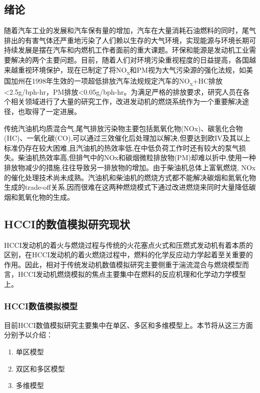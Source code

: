 \documentclass{ctexart}
\begin{document}
	\begin{mainmatter}
		\section{绪论}
		
		随着汽车工业的发展和汽车保有量的增加，汽车在大量消耗石油燃料的同时，尾气排出的有害气体还严重地污染了人们赖以生存的大气环境，实现能源与环境长期可持续发展是摆在汽车和内燃机工作者面前的重大课题。环保和能源是发动机工业需要解决的两个主要问题。目前，随着人们对环境污染重视程度的日益提高，各国越来越重视环境保护，现在已制定了将NO\textsubscript{x}和PM视为大气污染源的强化法规，如美国加州在1998年生效的一项超低排放汽车法规规定汽车的NO\textsubscript{x}+HC排放<2.5g/bph-hr，PM排放<0.05g/bph-hr。为满足严格的排放要求，研究人员在各个相关领域进行了大量的研究工作，改进发动机的燃烧系统作为一个重要解决途径，也取得了一定进展\cite{ref1}。
		
		传统汽油机均质混合气,尾气排放污染物主要包括氮氧化物(NOx)、碳氢化合物(HC)、一氧化碳(CO),可以通过三效催化后处理加以解决,但要达到欧IV及其以上标准仍存在较大困难,且汽油机的热效率低,在中低负荷工作时还有较大的泵气损失。柴油机热效率高,但排气中的NOx和碳烟微粒排放物(PM)却难以折中,使用一种排放物减少的措施,往往导致另一排放物的增加。由于柴油机总体上富氧燃烧, NOx的催化处理技术尚未成熟。汽油机和柴油机的燃烧方式都不能解决碳烟和氮氧化物生成的trade-off关系,因而很难在这两种燃烧模式下通过改进燃烧来同时大量降低碳烟和氮氧化物的生成。
		
		\subsection{HCCI的数值模拟研究现状}
		\par\indent HCCI发动机的着火与燃烧过程与传统的火花塞点火式和压燃式发动机有着本质的区别，在HCCI发动机的着火燃烧过程中，燃料的化学反应动力学起着至关重要的作用。因此，相对于传统发动机数值模拟研究主要侧重于湍流混合与燃烧模型而言，HCCI发动机燃烧模拟的焦点主要集中在燃料的反应机理和化学动力学模型上。
		
		\subsubsection{HCCI数值模拟模型}
		\par\indent 目前HCCI数值模拟研究主要集中在单区、多区和多维模型上\cite{ref2}。本节将从这三方面分别予以介绍：
		
		\begin{enumerate}
			\item 单区模型
			\item 双区和多区模型
			\item 多维模型
		\end{enumerate}
		

\end{mainmatter}
\end{document}
